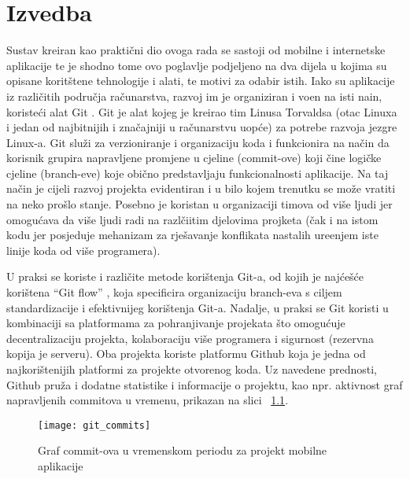 \chapter{Izvedba}

Sustav kreiran kao prakti\v{c}ni dio ovoga rada se sastoji od mobilne i internetske aplikacije te je shodno tome ovo poglavlje podjeljeno na dva dijela u kojima su opisane korit\v{s}tene tehnologije i alati, te motivi za odabir istih. Iako su aplikacije iz razli\v{c}itih podru\v{c}ja ra\v{c}unarstva, razvoj im je organiziran i vo\dj en na isti nain, koriste\'{c}i alat Git \cite{git}. Git je alat kojeg je kreirao tim Linusa Torvaldsa (otac Linuxa i jedan od najbitnijih i zna\v{c}ajniji u ra\v{c}unarstvu uop\'{c}e) za potrebe razvoja jezgre Linux-a. Git slu\v{z}i za verzioniranje i organizaciju koda i funkcionira na na\v{c}in da korisnik grupira napravljene promjene u cjeline (commit-ove) koji \v{c}ine logi\v{c}ke cjeline (branch-eve) koje obi\v{c}no predstavljaju funkcionalnosti aplikacije. Na taj na\v{c}in je cijeli razvoj projekta evidentiran i u bilo kojem trenutku se mo\v{z}e vratiti na neko pro\v{s}lo stanje. Posebno je koristan u organizaciji timova od vi\v{s}e ljudi jer omogu\'{c}ava da vi\v{s}e ljudi radi na razl\v{c}iitim djelovima projketa (\v{c}ak i na istom kodu jer posjeduje mehanizam za rje\v{s}avanje konflikata nastalih ure\dj enjem iste linije koda od vi\v{s}e programera). 

U praksi se koriste i razli\v{c}ite metode kori\v{s}tenja Git-a, od kojih je naj\'{c}e\v{s}\'{c}e kori\v{s}tena ``Git flow'' \cite{git_flow}, koja specificira organizaciju branch-eva s ciljem standardizacije i efektivnijeg kori\v{s}tenja Git-a. Nadalje, u praksi se Git koristi u kombinaciji sa platformama za pohranjivanje projekata \v{s}to omogu\'{c}uje decentralizaciju projekta, kolaboraciju vi\v{s}e programera i sigurnost (rezervna kopija je serveru). Oba projekta koriste platformu Github \cite{github} koja je jedna od najkori\v{s}tenijih platformi za projekte otvorenog koda. Uz navedene prednosti, Github pru\v{z}a i dodatne statistike i informacije o projektu, kao npr. aktivnost graf napravljenih commitova u vremenu, prikazan na slici  ~\ref{fig:commits}.

\begin{figure}[!htbp]
	\begin{center}
 \texttt{[image: git\_commits]}
 \caption{Graf commit-ova u vremenskom periodu za projekt mobilne aplikacije}
 \label{fig:commits}
	\end{center}
\end{figure}

